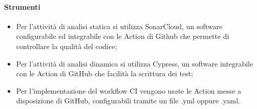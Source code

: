 \paragraph{Strumenti}
\begin{itemize}
	\item Per l'attività di analisi statica si utilizza SonarCloud, un software configurabile ed integrabile con le Action di Github che permette di controllare la qualità del codice;
	\item Per l'attività di analisi dinamica si utilizza Cypress, un software integrabile con le Action di GitHub che facilità la scrittura dei test;
	\item Per l'implementazione del workflow CI vengono usate le Action messe a disposizione di GitHub, configurabili tramite un file .yml oppure .yaml.
\end{itemize}